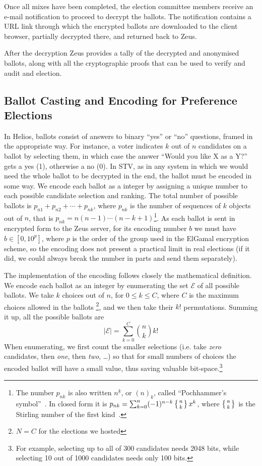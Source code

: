 \documentclass[letterpaper,twocolumn,10pt]{article}
\begin{document}
Once all mixes have been completed, the election committee members
receive an e-mail notification to proceed to decrypt the ballots. The
notification contains a URL link through which the encrypted ballots
are downloaded to the client browser, partially decrypted there, and
returned back to Zeus.

After the decryption Zeus provides a tally of the decrypted and
anonymised ballots, along with all the cryptographic proofs that can
be used to verify and audit and election.

\subsection{Ballot Casting and Encoding for Preference Elections}

In Helios, ballots consist of answers to binary ``yes'' or ``no''
questions, framed in the appropriate way. For instance, a voter
indicates $k$ out of $n$ candidates on a ballot by selecting them, in
which case the answer ``Would you like X as a Y?'' gets a yes (1),
otherwise a no (0). In STV, as in any system in which we would need
the whole ballot to be decrypted in the end, the ballot must be
encoded in some way. We encode each ballot as a integer by assigning a
unique number to each possible candidate selection and ranking. The
total number of possible ballots is $p _{n1} + p_{n2} + \cdots + p
_{nk}$, where $p_{nk}$ is the number of sequences of $k$ objects out
of $n$, that is $p_{nk} = n(n - 1)\cdots(n - k + 1)$\footnote{The
  number $p_{nk}$ is also written $n^{\underline{k}}$, or $(n)_k$,
  called ``Pochhammer's symbol''~\cite[p.\ 48]{graham:1994}. In closed
  form it is $p_{nk} = \sum_{k=0}^{n} (-1)^{n-k}\left\{n \atop
    k\right\}x^k$, where $\left\{n \atop k\right\}$ is the Stirling
  number of the first kind~\cite{weisstein:pochhammer}.}. As each
ballot is sent in encrypted form to the Zeus server, for its encoding
number $b$ we must have $b \in [0, 10^p]$, where $p$ is the order of
the group used in the ElGamal encryption scheme, so the encoding does
not present a practical limit in real elections (if it did, we could
always break the number in parts and send them separately).

The implementation of the encoding follows closely the mathematical
definition. We encode each ballot as an integer by enumerating the set
$\mathcal{E}$ of all possible ballots. We take $k$ choices out of $n$,
for $0\leq k \leq C$, where $C$ is the maximum choices allowed in the
ballots \footnote{$N=C$ for the elections we hosted}, and we then take
their $k!$ permutations. Summing it up, all the possible ballots are
\begin{equation}
\label{eq:max_encoded}
|\mathcal{E}| = \sum^{C}_{k=0}\binom{n}{k}k!
\end{equation}
When enumerating, we first count the smaller selections (i.e. take
\textit{zero} candidates, then \textit{one}, then \textit{two},
\ldots) so that for small numbers of choices the encoded ballot will
have a small value, thus saving valuable bit-space.\footnote{ For
  example, selecting up to all of 300 candidates needs 2048 bits,
  while selecting 10 out of 1000 candidates needs only 100 bits.}
\end{document}
